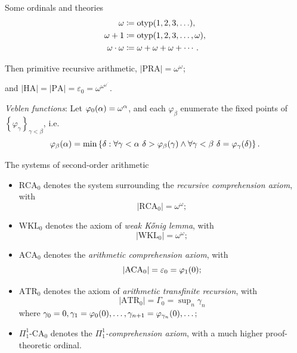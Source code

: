 \documentclass{beamer}
\newcommand{\highlight}[1]{{\usebeamercolor[fg]{frametitle}\emph{#1}}}
\begin{document}
\begin{frame}{Some ordinals and theories}
  \begin{align*}
    \omega              & \coloneqq \mathrm{otyp}\mleft(1, 2, 3, \ldots\mright),         \\
    \omega + 1          & \coloneqq \mathrm{otyp}\mleft(1, 2, 3, \ldots, \omega\mright), \\
    \omega \cdot \omega & \coloneqq \omega + \omega + \omega + \cdots.
  \end{align*}

  Then primitive recursive arithmetic, $\left|\mathrm{PRA}\right| = \omega^\omega$;

  and $\left|\mathrm{HA}\right| = \left|\mathrm{PA}\right| = \varepsilon_0 = \omega^{\omega^{\omega^{\iddots}}}$.

  \pause

  \vspace{1.2em}

  \highlight{Veblen functions}: Let $\varphi_0\mleft(\alpha\mright) = \omega^\alpha$, and each $\varphi_\beta$ enumerate the fixed points of $\left\{\varphi_\gamma\right\}_{\gamma < \beta}$, i.e.\
  \[\varphi_\beta\mleft(\alpha\mright) = \min \left\{\delta : \forall \gamma < \alpha \ \delta > \varphi_\beta\mleft(\gamma\mright) \land \forall \gamma < \beta \ \delta = \varphi_\gamma\mleft(\delta\mright)\right\}.\]
\end{frame}

\begin{frame}{The systems of second-order arithmetic}
  \begin{itemize}
    \item $\mathrm{RCA}_0$ denotes the system surrounding the \emph{recursive comprehension axiom}, with
          \[\left|\mathrm{RCA}_0\right| = \omega^\omega;\]
    \item $\mathrm{WKL}_0$ denotes the axiom of \emph{weak K\H{o}nig lemma}, with
          \[\left|\mathrm{WKL}_0\right| = \omega^\omega;\]
    \item $\mathrm{ACA}_0$ denotes the \emph{arithmetic comprehension axiom}, with
          \[\left|\mathrm{ACA}_0\right| = \varepsilon_0 = \varphi_1\mleft(0\mright);\]
    \item $\mathrm{ATR}_0$ denotes the axiom of \emph{arithmetic transfinite recursion}, with
          \[\left|\mathrm{ATR}_0\right| = \Gamma_0 = \sup\nolimits_n \gamma_n\]
          where $\gamma_0 = 0, \gamma_1 = \varphi_0\mleft(0\mright), \ldots, \gamma_{n + 1} = \varphi_{\gamma_n}\mleft(0\mright), \ldots$;
    \item $\Pi^1_1\text{-}\mathrm{CA}_0$ denotes the \emph{$\Pi^1_1$-comprehension axiom}, with a much higher proof-theoretic ordinal.
  \end{itemize}
\end{frame}
\end{document}
